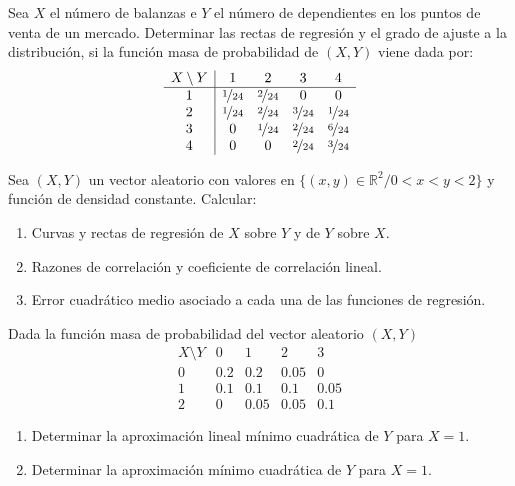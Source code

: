 \begin{ejercicio}
    Sea $X$ el número de balanzas e $Y$ el número de dependientes en los puntos de venta de un mercado. Determinar las rectas de regresión y el grado de ajuste a la distribución, si la función masa de probabilidad de $(X,Y)$ viene dada por:
    \begin{equation*}
        \begin{array}{c|cccc}
            X\setminus Y & 1 & 2 & 3 & 4\\
            \hline
            1 & \nicefrac{1}{24} & \nicefrac{2}{24} & 0 & 0\\
            2 & \nicefrac{1}{24} & \nicefrac{2}{24} & \nicefrac{3}{24} & \nicefrac{1}{24}\\
            3 & 0 & \nicefrac{1}{24} & \nicefrac{2}{24} & \nicefrac{6}{24}\\
            4 & 0 & 0 & \nicefrac{2}{24} & \nicefrac{3}{24}
        \end{array}
    \end{equation*}
\end{ejercicio}

\begin{ejercicio}
    Sea $(X,Y)$ un vector aleatorio con valores en $\{(x, y) \in \mathbb{R}^2/0 < x < y < 2\}$ y función de densidad constante. Calcular:
    \begin{enumerate}
        \item Curvas y rectas de regresión de $X$ sobre $Y$ y de $Y$ sobre $X$.
        \item Razones de correlación y coeficiente de correlación lineal.
        \item Error cuadrático medio asociado a cada una de las funciones de regresión.
    \end{enumerate}
\end{ejercicio}

\begin{ejercicio}
    Dada la función masa de probabilidad del vector aleatorio $(X,Y)$
    \begin{equation*}
        \begin{array}{c|cccc}
            X\setminus Y & 0 & 1 & 2 & 3\\
            \hline
            0 & 0.2 & 0.2 & 0.05 & 0\\
            1 & 0.1 & 0.1 & 0.1 & 0.05\\
            2 & 0 & 0.05 & 0.05 & 0.1
        \end{array}
    \end{equation*}
    \begin{enumerate}
        \item Determinar la aproximación lineal mínimo cuadrática de $Y$ para $X = 1$.
        \item Determinar la aproximación mínimo cuadrática de $Y$ para $X = 1$.
    \end{enumerate}
\end{ejercicio}

